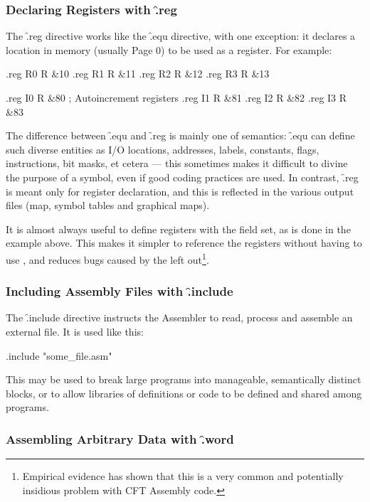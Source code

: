 \subsubsection{Declaring Registers with \f{.reg}}

The \f{.reg} directive works like the \f{.equ} directive, with one exception:
it declares a location in memory (usually Page 0) to be used as a register. For
example:

\begin{cftasmcode}
.reg  R0   R &10
.reg  R1   R &11
.reg  R2   R &12
.reg  R3   R &13

.reg  I0   R &80 ; Autoincrement registers
.reg  I1   R &81
.reg  I2   R &82
.reg  I3   R &83
\end{cftasmcode}

The difference between \f{.equ} and \f{.reg} is mainly one of semantics:
\f{.equ} can define such diverse entities as I/O locations, addresses, labels,
constants, flags, instructions, bit masks, et cetera — this sometimes makes it
difficult to divine the purpose of a symbol, even if good coding practices are
used. In contrast, \f{.reg} is meant only for register declaration, and this is
reflected in the various output files (map, symbol tables and graphical maps).

It is almost always useful to define registers with the  field
set, as is done in the example above. This makes it simpler to
reference the registers without having to use , and reduces
bugs caused by the  left out\footnote{Empirical evidence has
  shown that this is a very common and potentially insidious problem
  with CFT Assembly code.}.

\subsubsection{Including Assembly Files with \f{.include}}

The \f{.include} directive instructs the Assembler to read, process and
assemble an external file. It is used like this:

\begin{cftasmcode}
.include "some_file.asm"
\end{cftasmcode}

This may be used to break large programs into manageable, semantically distinct
blocks, or to allow libraries of definitions or code to be defined and shared
among programs.



\subsubsection{Assembling Arbitrary Data with \f{.word}}

